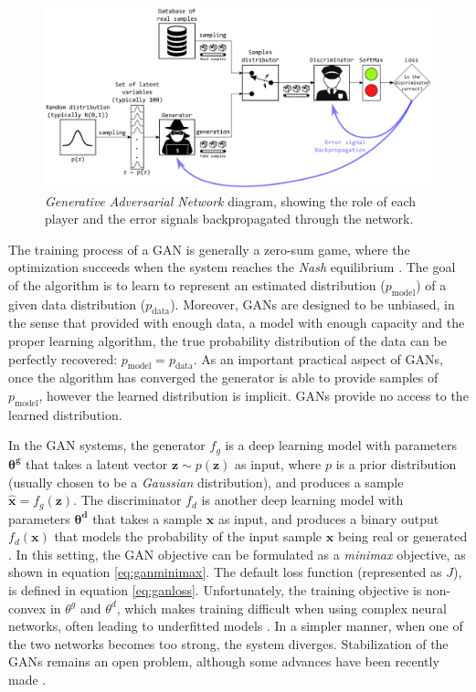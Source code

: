 \begin{figure}[h]
	\centering
	\includegraphics[width=1\textwidth]{chapter2/images/police_counterfeiter.eps}
	\caption{\textit{Generative Adversarial Network} diagram, showing the role of each player and the error signals backpropagated through the network.}
	\label{fig:police_counterfeiter}
\end{figure}

The training process of a GAN is generally a zero-sum game, where the optimization succeeds when the system reaches the \textit{Nash} equilibrium \autocite{nash48}. The goal of the algorithm is to learn to represent an estimated distribution ($p_{\mathrm{model}}$) of a given data distribution ($p_{\mathrm{data}}$). Moreover, GANs are designed to be unbiased, in the sense that provided with enough data, a model with enough capacity and the proper learning algorithm, the true probability distribution of the data can be perfectly recovered: $p_{\mathrm{model}} = p_{\mathrm{data}}$. As an important practical aspect of GANs, once the algorithm has converged the generator is able to provide samples of $p_\mathrm{model}$, however the learned distribution is implicit. GANs provide no access to the learned distribution.

In the GAN systems, the generator $f_g$ is a deep learning model with parameters $\mathbf{\theta^g}$ that takes a latent vector $\mathbf{z} \sim p(\mathbf{z})$ as input, where $p$ is a prior distribution (usually chosen to be a \textit{Gaussian} distribution), and produces a sample $\hat{\mathbf{x}}=f_g(\mathbf{z})$. The discriminator $f_d$ is another deep learning model with parameters $\mathbf{\theta^d}$ that takes a sample $\mathbf{x}$ as input, and produces a binary output $f_d(\mathbf{x})$ that models the probability of the input sample $\mathbf{x}$ being real or generated \autocite{Goodfellow2014}. In this setting, the GAN objective can be formulated as a \textit{minimax} objective, as shown in equation \ref{eq:ganminimax}. The default loss function (represented as $J$), is defined in equation \ref{eq:ganloss}. Unfortunately, the training objective is non-convex in $\theta^g$ and $\theta^d$, which makes training difficult when using complex neural networks, often leading to underfitted models \autocite{Goodfellow2016b,Goodfellow2016}. In a simpler manner, when one of the two networks becomes too strong, the system diverges. Stabilization of the GANs remains an open problem, although some advances have been recently made \autocite{arjovsky2017, shaobo2017, wang2022}.

